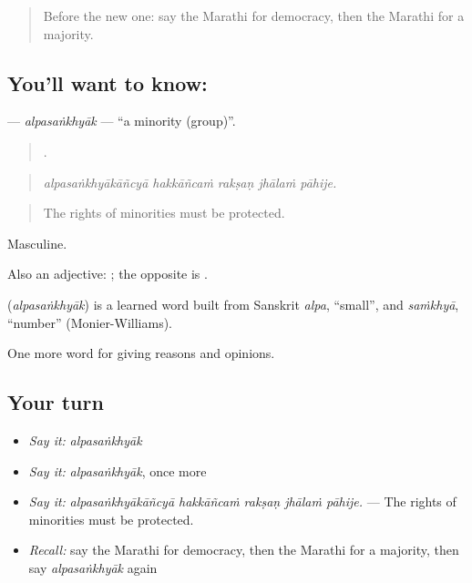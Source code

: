 \label{lesson:MR-C356-alpasankhyak}



\begin{quote}
Before the new one: say the Marathi for democracy, then the Marathi for a majority.
\end{quote}

\subsection*{You'll want to know: }
\textbf{} — \emph{alpasaṅkhyāk} — \textquotedblleft{}a minority (group)\textquotedblright{}.

\begin{quote}
    .
\end{quote}

\begin{quote}
\emph{alpasaṅkhyākāñcyā hakkāñcaṁ rakṣaṇ jhālaṁ pāhije.}
\end{quote}

\begin{quote}
The rights of minorities must be protected.
\end{quote}

Masculine.

Also an adjective:  ; the opposite is .

\begin{cousinweb}
\textbf{} (\emph{alpasaṅkhyāk}) is a learned word built from Sanskrit \emph{alpa}, \textquotedblleft{}small\textquotedblright{}, and \emph{saṁkhyā}, \textquotedblleft{}number\textquotedblright{} (Monier-Williams).
\end{cousinweb}

\begin{grammarlens}[title={What you've built}]
One more word for giving reasons and opinions.
\end{grammarlens}

\subsection*{Your turn}
\begin{itemize}
\raggedright
  \item \emph{Say it:} \emph{alpasaṅkhyāk}
  \item \emph{Say it:} \emph{alpasaṅkhyāk}, once more
  \item \emph{Say it:} \emph{alpasaṅkhyākāñcyā hakkāñcaṁ rakṣaṇ jhālaṁ pāhije.} — The rights of minorities must be protected.
  \item \emph{Recall:} say the Marathi for democracy, then the Marathi for a majority, then say \emph{alpasaṅkhyāk} again
\end{itemize}

